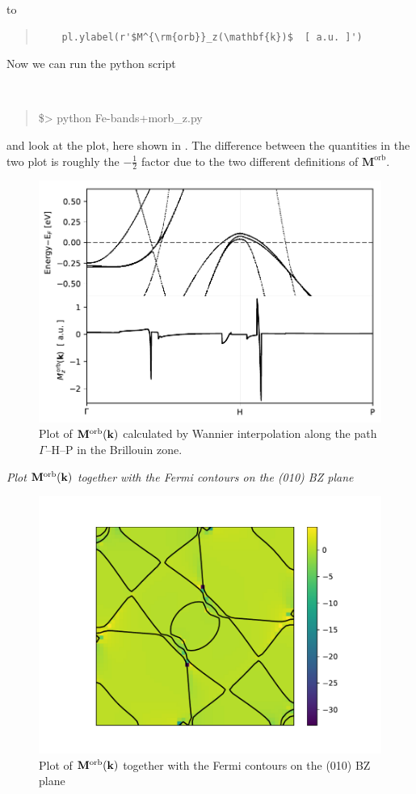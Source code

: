 \begin{itemize}
to

\begin{quote}
\begin{verbatim}
	pl.ylabel(r'$M^{\rm{orb}}_z(\mathbf{k})$  [ a.u. ]')
\end{verbatim}
\end{quote}

Now we can run the python script

{\tt
\begin{quote}
\$> python Fe-bands+morb\_z.py
\end{quote}
}

and look at the plot, here shown in . 
The difference between the quantities in the two plot is roughly the $-\frac{1}{2}$ factor due to the two different definitions of $\mathbf{M}^{\mathrm{orb}}$.   
\begin{figure}[t!]
\centering
\includegraphics[width=0.6\columnwidth]{figure/example19/Fe-morb_z.pdf}
\caption{Plot of $\mathbf{M}^{\mathrm{orb}}(\bfk)$ calculated by Wannier
interpolation along the path $\Gamma$--H--P in the Brillouin zone.}\label{fig19.1}
\end{figure}

{\it Plot $\mathbf{M}^{\mathrm{orb}}(\bfk)$ together with the Fermi contours on the (010) BZ plane}

\begin{figure}[b!]
\centering
\includegraphics[width=0.7\columnwidth]{figure/example19/Fe-kslice-morb_z+fermi_lines.pdf}
\caption{Plot of $\mathbf{M}^{\mathrm{orb}}(\bfk)$ together with the Fermi contours on the (010) BZ plane}\label{fig19.3}
\end{figure}

\end{itemize}
